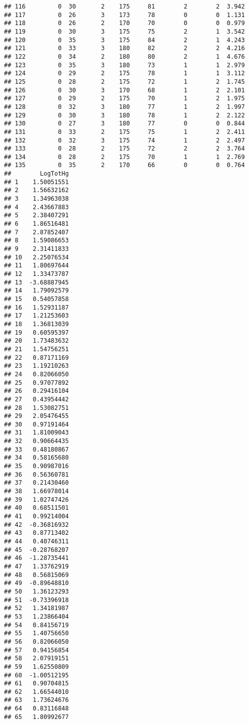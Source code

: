 \documentclass[12pt,]{article}
\begin{document}
\begin{verbatim}
## 116         0  30       2    175     81        2        2  3.942
## 117         0  26       3    173     78        0        0  1.131
## 118         0  26       2    170     70        0        0  0.979
## 119         0  30       3    175     75        2        1  3.542
## 120         0  35       3    175     84        2        1  4.243
## 121         0  33       3    180     82        2        2  4.216
## 122         0  34       2    180     80        2        1  4.676
## 123         0  35       3    180     73        1        1  2.979
## 124         0  29       2    175     78        1        1  3.112
## 125         0  28       2    175     72        1        2  1.745
## 126         0  30       3    170     68        1        2  2.101
## 127         0  29       2    175     70        1        2  1.975
## 128         0  32       3    180     77        1        2  1.997
## 129         0  30       3    180     78        1        2  2.122
## 130         0  27       3    180     77        0        0  0.844
## 131         0  33       2    175     75        1        2  2.411
## 132         0  32       3    175     74        1        2  2.497
## 133         0  28       2    175     72        2        2  3.764
## 134         0  28       2    175     70        1        1  2.769
## 135         0  35       2    170     66        0        0  0.764
##        LogTotHg
## 1    1.50051551
## 2    1.56632162
## 3    1.34963038
## 4    2.43667883
## 5    2.38407291
## 6    1.86516481
## 7    2.87852407
## 8    1.59086653
## 9    2.31411833
## 10   2.25076534
## 11   1.80697644
## 12   1.33473787
## 13  -3.68887945
## 14   1.79092579
## 15   0.54057858
## 16   1.52931187
## 17   1.21253603
## 18   1.36813039
## 19   0.60595397
## 20   1.73483632
## 21   1.54756251
## 22   0.87171169
## 23   1.19210263
## 24   0.82066050
## 25   0.97077892
## 26   0.29416104
## 27   0.43954442
## 28   1.53082751
## 29   2.05476455
## 30   0.97191464
## 31   1.81009043
## 32   0.90664435
## 33   0.48180867
## 34   0.58165680
## 35   0.90987016
## 36   0.56360781
## 37   0.21430460
## 38   1.66978014
## 39   1.02747426
## 40   0.68511501
## 41   0.99214004
## 42  -0.36816932
## 43   0.87713402
## 44   0.40746311
## 45  -0.28768207
## 46  -1.28735441
## 47   1.33762919
## 48   0.56815069
## 49  -0.89648810
## 50   1.36123293
## 51  -0.73396918
## 52   1.34181987
## 53   1.23866404
## 54   0.84156719
## 55   1.40756650
## 56   0.82066050
## 57   0.94156854
## 58   2.07919151
## 59   1.62550809
## 60  -1.00512195
## 61   0.90704815
## 62   1.66544010
## 63   1.73624676
## 64   0.83116848
## 65   1.80992677

\end{verbatim}
\end{document}
